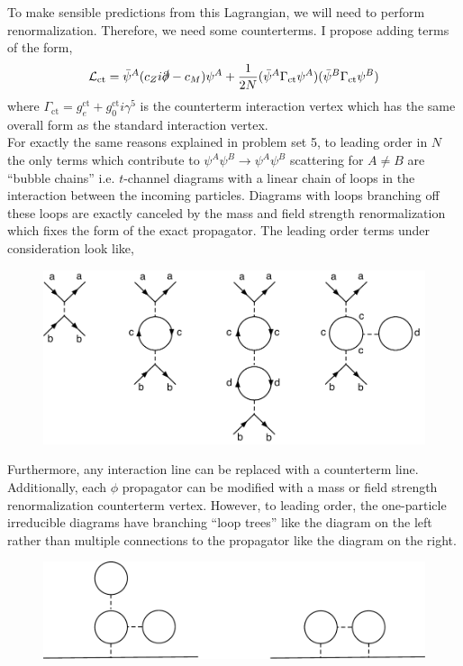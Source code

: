 \documentclass[12pt]{article}
\newcommand{\lagrange}{\mathcal{L}}
\begin{document}
To make sensible predictions from this Lagrangian, we will need to perform renormalization. Therefore, we need some counterterms. I propose adding terms of the form,
\[ \lagrange_{\mathrm{ct}} = \bar{\psi}^A (c_Z i \slashed{\partial} - c_M) \psi^A + \frac{1}{2 N} ( \bar{\psi}^A \Gamma_{\mathrm{ct}} \psi^{A} ) ( \bar{\psi}^B \Gamma_{\mathrm{ct}} \psi^B) \]
where $\Gamma_{\mathrm{ct}} = g_e^{\mathrm{ct}} + g_0^{\mathrm{ct}} i \gamma^5$ is the counterterm interaction vertex which has the same overall form as the standard interaction vertex. 
\bigskip\\
For exactly the same reasons explained in problem set 5, to leading order in $N$ the only terms which contribute to $\psi^A \psi^B \to \psi^A \psi^B$ scattering for $A \neq B$ are ``bubble chains'' i.e. $t$-channel diagrams with a linear chain of loops in the interaction between the incoming particles. Diagrams with loops branching off these loops are exactly canceled by the mass and field strength renormalization which fixes the form of the exact propagator. The leading order terms under consideration look like,
\begin{figure}
\begin{center}
\includegraphics{leading-diagrams-UN}
\end{center}
\end{figure}
\noindent
Furthermore, any interaction line can be replaced with a counterterm line. Additionally, each $\phi$ propagator can be modified with a mass or field strength renormalization counterterm vertex. However, to leading order, the one-particle irreducible diagrams have branching ``loop trees'' like the diagram on the left rather than multiple connections to the propagator like the diagram on the right. 
\begin{figure}
\begin{center}
\includegraphics{UNtwopoint}
\end{center}
\end{figure}
\end{document}
